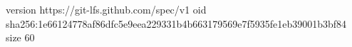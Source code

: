 version https://git-lfs.github.com/spec/v1
oid sha256:1e66124778af86dfc5e9eea229331b4b663179569e7f5935fe1eb39001b3bf84
size 60
